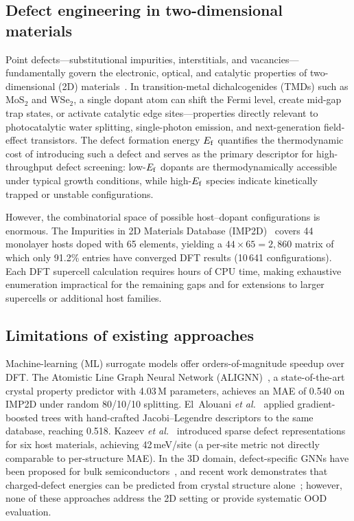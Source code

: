 
\subsection{Defect engineering in two-dimensional materials}

Point defects---substitutional impurities, interstitials, and
vacancies---fundamentally govern the electronic, optical, and catalytic
properties of two-dimensional (2D) materials~\cite{imp2d2023}.
In transition-metal dichalcogenides (TMDs) such as MoS$_2$ and WSe$_2$,
a single dopant atom can shift the Fermi level, create mid-gap trap states,
or activate catalytic edge sites---properties directly relevant to
photocatalytic water splitting, single-photon emission, and
next-generation field-effect transistors.
The defect formation energy $E_\mathrm{f}$ quantifies the thermodynamic cost of
introducing such a defect and serves as the primary descriptor for
high-throughput defect screening: low-$E_\mathrm{f}$ dopants are thermodynamically
accessible under typical growth conditions, while high-$E_\mathrm{f}$ species
indicate kinetically trapped or unstable configurations.

However, the combinatorial space of possible host--dopant configurations
is enormous.
The Impurities in 2D Materials Database (IMP2D)~\cite{imp2d2023} covers 44
monolayer hosts doped with 65 elements, yielding a $44\times65 = 2{,}860$
matrix of which only 91.2\% entries have converged DFT results
(10\,641 configurations).
Each DFT supercell calculation requires hours of CPU time, making exhaustive
enumeration impractical for the remaining gaps and for extensions to larger
supercells or additional host families.

\subsection{Limitations of existing approaches}

Machine-learning (ML) surrogate models offer orders-of-magnitude speedup
over DFT.
The Atomistic Line Graph Neural Network (ALIGNN)~\cite{alignn2021}, a
state-of-the-art crystal property predictor with 4.03\,M parameters, achieves
an MAE of 0.540\eV{} on IMP2D under random 80/10/10 splitting.
El~Alouani \textit{et al.}~\cite{elalouani2024} applied gradient-boosted
trees with hand-crafted Jacobi--Legendre descriptors to the same database,
reaching 0.518\eV{}.
Kazeev \textit{et al.}~\cite{kazeev2023} introduced sparse defect
representations for six host materials, achieving 42\,meV/site (a per-site
metric not directly comparable to per-structure MAE).
In the 3D domain, defect-specific GNNs have been proposed for bulk
semiconductors~\cite{rahman2024,witman2023}, and recent work demonstrates
that charged-defect energies can be predicted from crystal
structure alone~\cite{kiyohara2025}; however, none of these approaches
address the 2D setting or provide systematic OOD evaluation.

